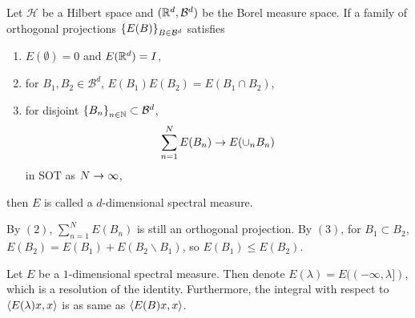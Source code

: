 \documentclass[a4paper,12pt]{article}
\begin{document}
\begin{defn}
    Let $\mathcal{H}$ be a Hilbert space and $(\mathbb{R}^d, \mathcal{B}^d)$ be the Borel measure space. If a family of orthogonal projections $\left\{E(B)\right\}_{B \in \mathcal{B}^d}$ satisfies
    \begin{enumerate}[label=(\arabic{*})]
        \item $E(\emptyset) = 0$ and $E(\mathbb{R}^d) = I$,
        \item for $B_1,B_2 \in \mathcal{B}^d$, $E(B_1)E(B_2) = E(B_1 \cap B_2)$,
        \item for disjoint $\left\{B_n\right\}_{n \in \mathbb{N}} \subset \mathcal{B}^d$,
        \begin{equation*}
            \sum_{n=1}^N E(B_n) \rightarrow E(\cup_nB_n)
        \end{equation*}
        in SOT as $N \rightarrow \infty$,
    \end{enumerate}
    then $E$ is called a $d$-dimensional spectral measure.
\end{defn}
\begin{rmk}
    By $(2)$, $\sum_{n=1}^N E(B_n)$ is still an orthogonal projection. By $(3)$, for $B_1 \subset B_2$, $E(B_2) = E(B_1) + E(B_2 \backslash B_1)$, so $E(B_1) \leq E(B_2)$.
\end{rmk}

\begin{prop}
    Let $E$ be a $1$-dimensional spectral measure. Then denote $E(\lambda) = E((-\infty,\lambda])$, which is a resolution of the identity. Furthermore, the integral with respect to $\left\langle E(\lambda)x,x \right\rangle$ is as same as $\left\langle E(B)x,x \right\rangle$.
\end{prop}
\end{document}
